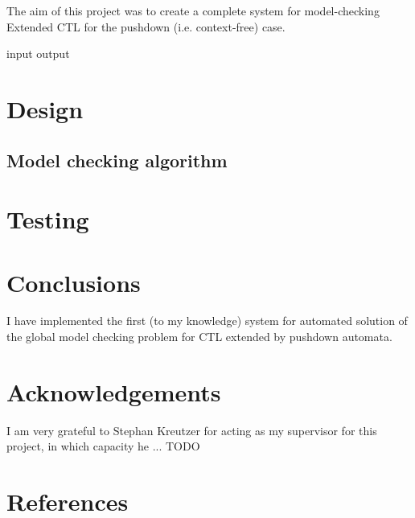 \documentclass[11pt]{article}
\begin{document}
The aim of this project was to create a complete system for model-checking Extended CTL for the pushdown (i.e. context-free) case. 

input
output



\section{Design}


\subsection{Model checking algorithm}


\cite{EHRS00b}

\section{Testing}

\section{Conclusions}

I have implemented the first (to my knowledge) system for automated solution of
the global model checking problem for CTL extended by pushdown automata.

\section{Acknowledgements}

I am very grateful to Stephan Kreutzer for acting as my supervisor for this project, in which capacity he ... TODO


\section{References}
{}

\end{document}
